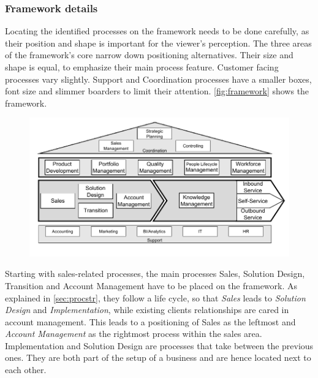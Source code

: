 	\subsubsection{Framework details}
	
	Locating the identified processes on the framework needs to be done carefully, as their position and shape is important for the viewer's perception. The three areas of the framework's core narrow down positioning alternatives. Their size and shape is equal, to emphasize their main process feature. Customer facing processes vary slightly. Support and Coordination processes have a smaller boxes, font size and slimmer boarders to limit their attention. \Fig \ref{fig:framework} shows the framework.
	
		\begin{figure}[caption={Framework}, label={fig:framework}]
		{	\includegraphics[width=.9\textwidth]{figures/framework.pdf}}
	\end{figure} 
	
	
	 Starting with sales-related processes, the main processes Sales, Solution Design, Transition and Account Management have to be placed on the framework. As explained in \ref{sec:procstr}, they follow a life cycle, so that \textit{Sales} leads to \textit{Solution Design} and \textit{Implementation}, while existing clients relationships are cared in account management. This leads to a positioning of Sales as the leftmost and \textit{Account Management} as the rightmost process within the sales area. Implementation and Solution Design are processes that take between the previous ones. They are both part of the setup of a business and are hence located next to each other. 
	 
